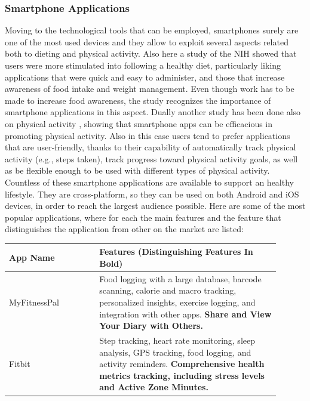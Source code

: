 \subsubsection{Smartphone Applications} %
Moving to the technological tools that can be employed, smartphones surely are one of the most used devices and they allow to exploit several aspects related both to dieting and physical activity. Also here a study of the NIH \cite{NihSmartphoneDieting} showed that users were more stimulated into following a healthy diet, particularly liking applications that were quick and easy to administer, and those that increase awareness of food intake and weight management. Even though work has to be made to increase food awareness, the study recognizes the importance of smartphone applications in this aspect. Dually another study has been done also on physical activity \cite{NihSmartphonePhysicalActivity}, showing that smartphone apps can be efficacious in promoting physical activity. Also in this case users tend to prefer applications that are user-friendly, thanks to their capability of automatically track physical activity (e.g., steps taken), track progress toward physical activity goals, as well as be flexible enough to be used with different types of physical activity. Countless of these smartphone applications are available to support an healthy lifestyle. They are cross-platform, so they can be used on both Android and iOS devices, in order to reach the largest audience possible. Here are some of the most popular applications, where for each the main features and the feature that distinguishes the application from other on the market are listed:
\begin{table}[h!]
    \setstretch{\myspacing}
    \centering
    \begin{tabular}{|>{\raggedright\arraybackslash}p{0.3\linewidth}|>{\raggedright\arraybackslash}p{0.6\linewidth}|}
        \hline
        \textbf{App Name} & \textbf{Features (Distinguishing Features In Bold)}                                                                                                                                                                                              \\
        \hline
        MyFitnessPal      & Food logging with a large database, barcode scanning, calorie and macro tracking, personalized insights, exercise logging, and integration with other apps. \textbf{Share and View Your Diary with Others.} \\
        \hline
        Fitbit            & Step tracking, heart rate monitoring, sleep analysis, GPS tracking, food logging, and activity reminders. \textbf{Comprehensive health metrics tracking, including stress levels and Active Zone Minutes.}                                       \\
        \hline
    \end{tabular}
\end{table}

